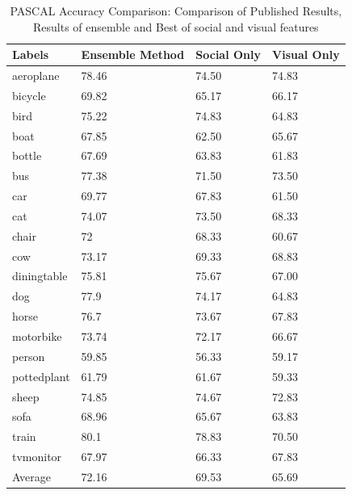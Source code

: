 \begin{table}
\centering
\caption{ PASCAL Accuracy Comparison: Comparison of Published Results, Results of ensemble and Best of social and visual features} %
\vspace*{0.2 cm}
\begin{tabular}{| p{1.7cm}| p{1.5cm}|p{1.2cm}|p{1.2cm}|} \hline
Labels & Ensemble Method & Social Only & Visual Only  \\  [1ex] \hline
aeroplane & 78.46 & 74.50 & 74.83 \\  [1ex] \hline
bicycle & 69.82 & 65.17 & 66.17 \\  [1ex] \hline
bird & 75.22 & 74.83 & 64.83 \\  [1ex] \hline
boat & 67.85 & 62.50 & 65.67 \\  [1ex] \hline
bottle & 67.69 & 63.83 & 61.83 \\  [1ex] \hline
bus & 77.38 & 71.50 & 73.50 \\  [1ex] \hline
car & 69.77 & 67.83 & 61.50 \\  [1ex] \hline
cat & 74.07 & 73.50 & 68.33 \\  [1ex] \hline
chair & 72 & 68.33 & 60.67 \\  [1ex] \hline
cow & 73.17 & 69.33 & 68.83 \\  [1ex] \hline
diningtable & 75.81 & 75.67 & 67.00 \\  [1ex] \hline
dog & 77.9 & 74.17 & 64.83 \\  [1ex] \hline
horse & 76.7 & 73.67 & 67.83 \\  [1ex] \hline
motorbike & 73.74 & 72.17 & 66.67 \\  [1ex] \hline
person & 59.85 & 56.33 & 59.17 \\  [1ex] \hline
pottedplant & 61.79 & 61.67 & 59.33 \\  [1ex] \hline
sheep & 74.85 & 74.67 & 72.83 \\  [1ex] \hline
sofa & 68.96 & 65.67 & 63.83 \\  [1ex] \hline
train & 80.1 & 78.83 & 70.50 \\  [1ex] \hline
tvmonitor & 67.97 & 66.33 & 67.83 \\  [1ex] \hline
Average & 72.16 & 69.53 & 65.69 \\  [1ex] \hline
\end{tabular}
 \label{PASCALAccuracyOverAll} %
\end{table}



